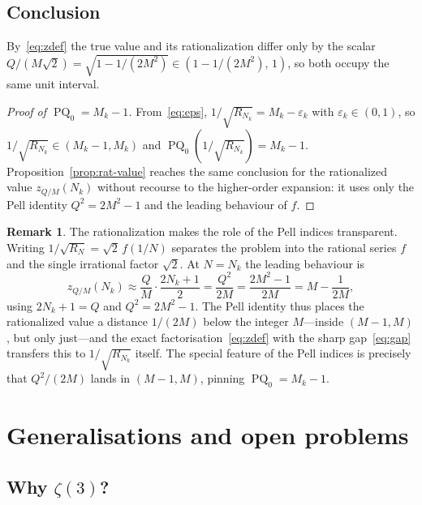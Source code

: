 \documentclass[12pt]{amsart}
\theoremstyle{definition}
\newtheorem{remark}[theorem]{Remark}
\DeclareMathOperator{\PQ}{PQ}
\begin{document}
\subsection{Conclusion}

By~\eqref{eq:zdef} the true value and its rationalization differ only by
the scalar $Q/(M\sqrt{2}) = \sqrt{1-1/(2M^2)} \in (1-1/(2M^2),\,1)$, so
both occupy the same unit interval.

\begin{proof}[Proof of $\PQ_0 = M_k - 1$]
  From~\eqref{eq:eps}, $1/\sqrt{R_{N_k}} = M_k - \varepsilon_k$ with
  $\varepsilon_k \in (0,1)$, so $1/\sqrt{R_{N_k}} \in (M_k-1, M_k)$ and
  $\PQ_0(1/\sqrt{R_{N_k}}) = M_k - 1$.  Proposition~\ref{prop:rat-value}
  reaches the same conclusion for the rationalized value $z_{Q/M}(N_k)$
  without recourse to the higher-order expansion: it uses only the Pell
  identity $Q^2 = 2M^2-1$ and the leading behaviour of $f$.
\end{proof}

\begin{remark}
  The rationalization makes the role of the Pell indices transparent.
  Writing $1/\sqrt{R_N} = \sqrt{2}\,f(1/N)$ separates the problem into the
  rational series $f$ and the single irrational factor $\sqrt{2}$.  At
  $N = N_k$ the leading behaviour is
  \[
    z_{Q/M}(N_k) \approx \frac{Q}{M}\cdot\frac{2N_k+1}{2}
    = \frac{Q^2}{2M} = \frac{2M^2-1}{2M} = M - \frac{1}{2M},
  \]
  using $2N_k+1 = Q$ and $Q^2 = 2M^2-1$.  The Pell identity thus places
  the rationalized value a distance $1/(2M)$ below the integer $M$---inside
  $(M-1, M)$, but only just---and the exact factorisation~\eqref{eq:zdef}
  with the sharp gap~\eqref{eq:gap} transfers this to $1/\sqrt{R_{N_k}}$
  itself.  The special feature of the Pell indices is precisely that
  $Q^2/(2M)$ lands in $(M-1, M)$, pinning $\PQ_0 = M_k - 1$.
\end{remark}

\section{Generalisations and open problems}
\label{sec:gen}

\subsection{Why $\zeta(3)$?}
\end{document}
